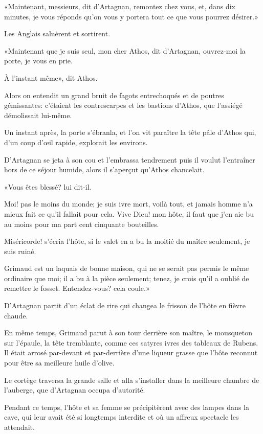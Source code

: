 «Maintenant, messieurs, dit d'Artagnan, remontez chez vous, et, dans dix minutes, je vous réponds qu'on vous y portera tout ce que vous pourrez désirer.» 

Les Anglais saluèrent et sortirent. 

«Maintenant que je suis seul, mon cher Athos, dit d'Artagnan, ouvrez-moi la porte, je vous en prie. 

\speak  À l'instant même», dit Athos. 

Alors on entendit un grand bruit de fagots entrechoqués et de poutres gémissantes: c'étaient les contrescarpes et les bastions d'Athos, que l'assiégé démolissait lui-même. 

Un instant après, la porte s'ébranla, et l'on vit paraître la tête pâle d'Athos qui, d'un coup d'œil rapide, explorait les environs. 

D'Artagnan se jeta à son cou et l'embrassa tendrement puis il voulut l'entraîner hors de ce séjour humide, alors il s'aperçut qu'Athos chancelait. 

«Vous êtes blessé? lui dit-il. 

\speak  Moi! pas le moins du monde; je suis ivre mort, voilà tout, et jamais homme n'a mieux fait ce qu'il fallait pour cela. Vive Dieu! mon hôte, il faut que j'en aie bu au moins pour ma part cent cinquante bouteilles. 

\speak  Miséricorde! s'écria l'hôte, si le valet en a bu la moitié du maître seulement, je suis ruiné. 

\speak  Grimaud est un laquais de bonne maison, qui ne se serait pas permis le même ordinaire que moi; il a bu à la pièce seulement; tenez, je crois qu'il a oublié de remettre le fosset. Entendez-vous? cela coule.» 

D'Artagnan partit d'un éclat de rire qui changea le frisson de l'hôte en fièvre chaude. 

En même temps, Grimaud parut à son tour derrière son maître, le mousqueton sur l'épaule, la tête tremblante, comme ces satyres ivres des tableaux de Rubens. Il était arrosé par-devant et par-derrière d'une liqueur grasse que l'hôte reconnut pour être sa meilleure huile d'olive. 

Le cortège traversa la grande salle et alla s'installer dans la meilleure chambre de l'auberge, que d'Artagnan occupa d'autorité. 

Pendant ce temps, l'hôte et sa femme se précipitèrent avec des lampes dans la cave, qui leur avait été si longtemps interdite et où un affreux spectacle les attendait. 

